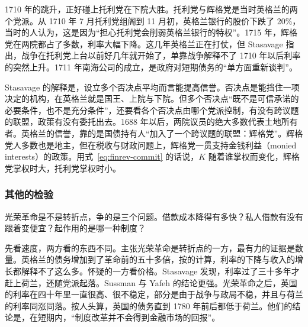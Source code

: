 1710 年的跳升，正好碰上托利党在下院大胜。托利党与辉格党是当时英格兰的两个党派。从 1710 年 7 月托利党组阁到 11 月初，英格兰银行的股价下跌了 20\%，当时的人认为，这是因为“担心托利党会削弱英格兰银行的特权”。1715 年，辉格党在两院都占了多数，利率大幅下降\cite{stasavage2002}。这几年英格兰正在打仗，但 Stasavage 指出，战争在托利党上台以前好几年就开始了，单靠战争解释不了 1710 年以后利率的突然上升\cite{stasavage2002}。1711 年南海公司的成立，是政府对短期债务的“单方面重新谈判”\cite{stasavage2002}。


Stasavage 的解释是，设立多个否决点平均而言能提高信誉。否决点是能挡住一项决定的机构，在英格兰就是国王、上院与下院。但多个否决点“既不是可信承诺的必要条件，也不是充分条件”，还要看各个否决点由哪个党派控制，有没有跨议题的联盟，政策有没有委托出去\cite{stasavage2002}。1688 年以后，两院议员的绝大多数代表土地所有者。英格兰的信誉，靠的是国债持有人“加入了一个跨议题的联盟：辉格党”。辉格党人多数也是地主，但在税收与财政问题上，辉格党一贯支持金钱利益（monied interests）的政策\cite{stasavage2002}。用式~\eqref{eq:finrev-commit} 的话说，$K$ 随着谁掌权而变化，辉格党掌权时大，托利党掌权时小。

\subsubsection{其他的检验}
光荣革命是不是转折点，争的是三个问题。借款成本降得有多快？私人借款有没有跟着变便宜？起作用的是哪一种制度？

先看速度，两方看的东西不同。主张光荣革命是转折点的一方，最有力的证据是数量。英格兰的债务增加到了革命前的五十多倍，按的计算，利率的下降与收入的增长都解释不了这么多。怀疑的一方看价格。Stasavage 发现，利率过了三十多年才赶上荷兰，还随党派起落。Sussman 与 Yafeh 的结论更强。光荣革命之后，英国的利率在四十年里一直很高、很不稳定，部分是由于战争与政局不稳，并且与荷兰的利率同涨同落。按人头算，英国的债务直到 1780 年前后都低于荷兰。他们的结论是，在短期内，“制度改革并不会得到金融市场的回报”\cite{sy2006}。

